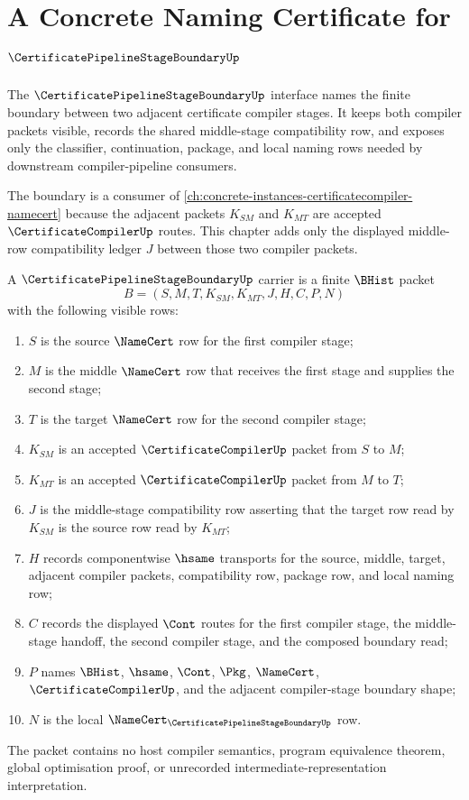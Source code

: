 \chapter{A Concrete Naming Certificate for $\CertificatePipelineStageBoundaryUp$}
\label{ch:concrete-instances-certificate-pipeline-stage-boundary-namecert}

The $\CertificatePipelineStageBoundaryUp$ interface names the finite boundary between two adjacent certificate compiler stages. It keeps both compiler packets visible, records the shared middle-stage compatibility row, and exposes only the classifier, continuation, package, and local naming rows needed by downstream compiler-pipeline consumers.

The boundary is a consumer of \autoref{ch:concrete-instances-certificatecompiler-namecert} because the adjacent packets $K_{SM}$ and $K_{MT}$ are accepted $\CertificateCompilerUp$ routes. This chapter adds only the displayed middle-row compatibility ledger $J$ between those two compiler packets.

\begin{definition}
\label{def:certificate-pipeline-stage-boundary-carrier}
A $\CertificatePipelineStageBoundaryUp$ carrier is a finite $\BHist$ packet
$$
B=(S,M,T,K_{SM},K_{MT},J,H,C,P,N)
$$
with the following visible rows:
\begin{enumerate}
\item $S$ is the source $\NameCert$ row for the first compiler stage;
\item $M$ is the middle $\NameCert$ row that receives the first stage and supplies the second stage;
\item $T$ is the target $\NameCert$ row for the second compiler stage;
\item $K_{SM}$ is an accepted $\CertificateCompilerUp$ packet from $S$ to $M$;
\item $K_{MT}$ is an accepted $\CertificateCompilerUp$ packet from $M$ to $T$;
\item $J$ is the middle-stage compatibility row asserting that the target row read by $K_{SM}$ is the source row read by $K_{MT}$;
\item $H$ records componentwise $\hsame$ transports for the source, middle, target, adjacent compiler packets, compatibility row, package row, and local naming row;
\item $C$ records the displayed $\Cont$ routes for the first compiler stage, the middle-stage handoff, the second compiler stage, and the composed boundary read;
\item $P$ names $\BHist$, $\hsame$, $\Cont$, $\Pkg$, $\NameCert$, $\CertificateCompilerUp$, and the adjacent compiler-stage boundary shape;
\item $N$ is the local $\NameCert_{\CertificatePipelineStageBoundaryUp}$ row.
\end{enumerate}
The packet contains no host compiler semantics, program equivalence theorem, global optimisation proof, or unrecorded intermediate-representation interpretation.
\end{definition}

